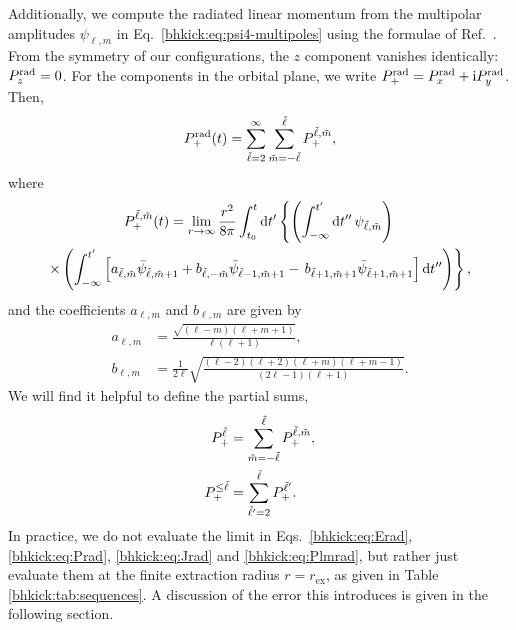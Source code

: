 Additionally, we compute the radiated linear momentum from the multipolar
amplitudes $\psi_{\ell, m}$ in Eq.~\eqref{bhkick:eq:psi4-multipoles} using the 
formulae of Ref.~\cite{Ruiz:2007yx}. From the symmetry of our 
configurations, the $z$ component vanishes identically: $P_z^{\mathrm{rad}}=0$.
For the components in the orbital plane, we write
$P_+^{\mathrm{rad}}=P_x^{\mathrm{rad}}+\mathrm{i}P_y^{\mathrm{rad}}$. Then,
\begin{equation}
     P_+^{\mathrm{rad}}(t) = \sum_{\tilde{\ell}=2}^{\infty}
     \sum_{\tilde{m}=-\tilde{\ell}}^{\tilde{\ell}}P_+^{\tilde{\ell},\tilde{m}},
     \label{bhkick:eq:P+rad}
\end{equation}
where
\begin{multline}
    P_+^{\tilde{\ell},\tilde{m}}(t) = \lim_{r\rightarrow \infty}
    \frac{r^2}{8\pi}\int_{t_0}^t\mathrm{d} t^{\prime}
    \left\{\left(\int^{t^\prime}_{-\infty}\mathrm{d} t^{\prime\prime}\, 
    \psi_{\tilde{\ell},\tilde{m}}\right)\right. \\
    \left.\times\left(\int_{-\infty}^{t^\prime} 
    \left[a_{\tilde{\ell},\tilde{m}}\bar{\psi}_{\tilde{\ell},\tilde{m}+1}+ 
    b_{\tilde{\ell},-\tilde{m}}\bar{\psi}_{\tilde{\ell}-1,\tilde{m}+1}
    -\,b_{\tilde{\ell}+1,\tilde{m}+1}\bar{\psi}_{\tilde{\ell}+1,\tilde{m}+1}\right]
    \mathrm{d} t^{\prime\prime}\right)\right\},
    \label{bhkick:eq:Plmrad}
\end{multline}
and the coefficients $a_{\ell,m}$ and $b_{\ell,m}$ are given by
%
\begin{align}
    a_{\ell, m} &= \frac{\sqrt{\left(\ell - m\right)\left(\ell +
    m+1\right)}}{\ell\left(\ell + 1\right)},\\
    b_{\ell, m} &= \frac{1}{2\ell}\sqrt{\frac{\left(\ell - 2\right) 
    \left(\ell + 2\right) \left(\ell + m\right) \left(\ell + m - 
    1\right)}{\left(2\ell - 1\right)\left(\ell + 1\right)}}.
\end{align}
%
We will find it helpful to define the partial sums,
%
\begin{align}
    P_+^{\tilde{\ell}} &= \sum_{\tilde{m} = -\tilde{\ell}}^{\tilde{\ell}} P_+^{\tilde{\ell},\tilde{m}},\\
    P_+^{\leq\tilde{\ell}} &= \sum_{\tilde{\ell}^\prime=2}^{\tilde{\ell}} P_+^{\tilde{\ell}^\prime}. 
    \label{bhkick:eq:partialkick}
\end{align}
%
In practice, we do not evaluate the limit in Eqs.~\eqref{bhkick:eq:Erad}, 
\eqref{bhkick:eq:Prad}, \eqref{bhkick:eq:Jrad} and \eqref{bhkick:eq:Plmrad}, but rather just 
evaluate them at the finite extraction radius $r=r_{\mathrm{ex}}$, as given 
in Table \ref{bhkick:tab:sequences}. A discussion of the error this introduces is 
given in the following section.

